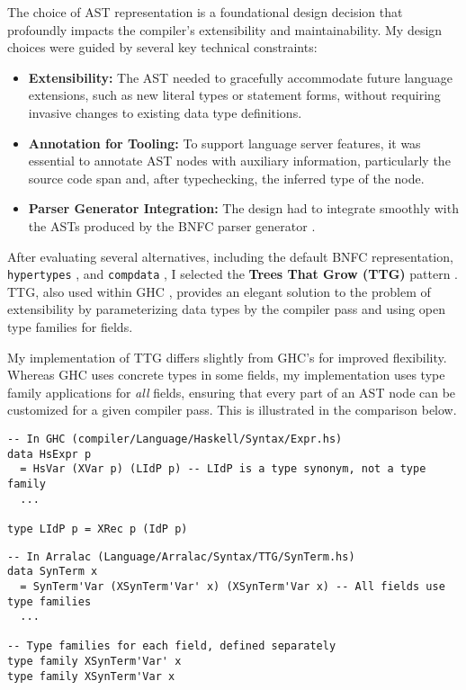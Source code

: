The choice of AST representation is a foundational design decision that profoundly impacts the compiler's extensibility and maintainability. My design choices were guided by several key technical constraints:
\begin{itemize}
    \item \textbf{Extensibility:} The AST needed to gracefully accommodate future language extensions, such as new literal types or statement forms, without requiring invasive changes to existing data type definitions.
    \item \textbf{Annotation for Tooling:} To support language server features, it was essential to annotate AST nodes with auxiliary information, particularly the source code span and, after typechecking, the inferred type of the node.
    \item \textbf{Parser Generator Integration:} The design had to integrate smoothly with the ASTs produced by the BNFC parser generator \cite{bnfc-site-2025}.
\end{itemize}

After evaluating several alternatives, including the default BNFC representation, \texttt{hypertypes} \cite{hypertypes-hackage}, and \texttt{compdata} \cite{compdata-hackage}, I selected the \textbf{Trees That Grow (TTG)} pattern \cite{trees-that-grow-2016}. TTG, also used within GHC \cite{ghc-gitlab-2025}, provides an elegant solution to the problem of extensibility by parameterizing data types by the compiler pass and using open type families for fields.

My implementation of TTG differs slightly from GHC's for improved flexibility. Whereas GHC uses concrete types in some fields, my implementation uses type family applications for \textit{all} fields, ensuring that every part of an AST node can be customized for a given compiler pass. This is illustrated in the comparison below.

\begin{verbatim}
-- In GHC (compiler/Language/Haskell/Syntax/Expr.hs)
data HsExpr p
  = HsVar (XVar p) (LIdP p) -- LIdP is a type synonym, not a type family
  ...

type LIdP p = XRec p (IdP p)
\end{verbatim}

\begin{verbatim}
-- In Arralac (Language/Arralac/Syntax/TTG/SynTerm.hs)
data SynTerm x
  = SynTerm'Var (XSynTerm'Var' x) (XSynTerm'Var x) -- All fields use type families
  ...

-- Type families for each field, defined separately
type family XSynTerm'Var' x
type family XSynTerm'Var x
\end{verbatim}

